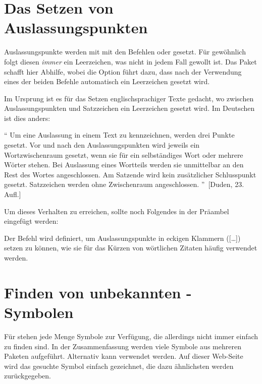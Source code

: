 \section{Das Setzen von Auslassungspunkten}
%
%
Auslassungspunkte werden mit  mit den Befehlen  oder 
 gesetzt. Für gewöhnlich folgt diesen \emph{immer} ein 
Leerzeichen, was nicht in jedem Fall gewollt ist. Das Paket  
schafft hier Abhilfe, wobei die Option  führt dazu, dass nach 
der Verwendung eines der beiden Befehle automatisch ein Leerzeichen gesetzt 
wird. 
%
\begin{quoting}
\begin{Code}
\usepackage[xspace]{ellipsis}
\end{Code}
\end{quoting}
%
Im Ursprung ist es für das Setzen englischsprachiger Texte gedacht, wo zwischen 
Auslassungspunkten und Satzzeichen ein Leerzeichen gesetzt wird. Im Deutschen 
ist dies anders:
%
\begin{quoting}
\enquote{%
  Um eine Auslassung in einem Text zu kennzeichnen, werden drei Punkte gesetzt. 
  Vor und nach den Auslassungspunkten wird jeweils ein Wortzwischenraum 
  gesetzt, wenn sie für ein selbständiges Wort oder mehrere Wörter stehen. Bei 
  Auslassung eines Wortteils werden sie unmittelbar an den Rest des Wortes 
  angeschlossen. Am Satzende wird kein zusätzlicher Schlusspunkt gesetzt. 
  Satzzeichen werden ohne Zwischenraum angeschlossen.%
}~[Duden, 23. Aufl.]
\end{quoting} 
%
Um dieses Verhalten zu erreichen, sollte noch Folgendes in der Präambel 
eingefügt werden:
%
\begin{quoting}
\begin{Code}
\let\ellipsispunctuation\relax
\newcommand*\qdots{[\dots{}]\xspace}
\end{Code}
\end{quoting}
%
Der Befehl  wird definiert, um Auslassungspunkte in eckigen 
Klammern ([\dots{}]) setzen zu können, wie sie für das Kürzen von wörtlichen 
Zitaten häufig verwendet werden.



\section{Finden von unbekannten -Symbolen}
Für  stehen jede Menge Symbole zur Verfügung, die allerdings 
nicht immer einfach zu finden sind. In der Zusammenfassung
%
{} werden viele Symbole aus mehreren Paketen aufgeführt. 
Alternativ kann  
verwendet werden. Auf dieser Web-Seite wird das gesuchte Symbol einfach 
gezeichnet, die dazu ähnlichsten werden zurückgegeben.



